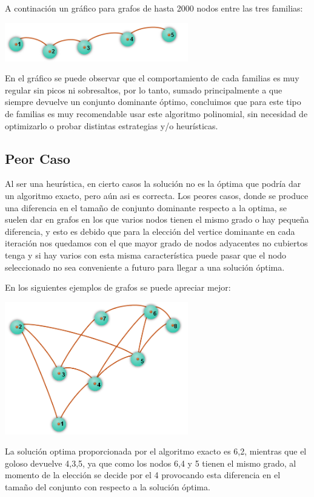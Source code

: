 A continación un gráfico para grafos de hasta 2000 nodos entre las tres familias:

\begin {center}
\includegraphics[width=8cm]{./graficos/grafo_camino.png}
\end {center} 

En el gráfico se puede observar que el comportamiento de cada familias es muy regular sin picos ni sobresaltos, por lo tanto, sumado principalmente a que siempre devuelve un conjunto dominante óptimo, concluimos que para este tipo de familias es muy recomendable usar este algoritmo polinomial, sin necesidad de optimizarlo o probar distintas estrategias y/o heurísticas.

\subsection{Peor Caso}

Al ser una heurística, en cierto casos la solución no es la óptima que podría dar un algoritmo exacto, pero aún asi es correcta.
Los peores casos, donde se produce una diferencia en el tamaño de conjunto dominante respecto a la optima, se suelen dar en grafos en los que varios nodos tienen el mismo grado o hay pequeña diferencia, y esto es debido que para la elección del vertice dominante en cada iteración nos quedamos con el que mayor grado de nodos adyacentes no cubiertos tenga y si hay varios con esta misma característica puede pasar que el nodo seleccionado no sea conveniente a futuro para llegar a una solución óptima.

En los siguientes ejemplos de grafos se puede apreciar mejor:

\begin {center}
\includegraphics[width=8cm]{./graficos/grafo.png}
\end {center} 
La solución optima proporcionada por el algoritmo exacto es {6,2}, mientras que el goloso devuelve {4,3,5}, ya que como los nodos 6,4 y 5 tienen el mismo grado, al momento de la elección se decide por el 4 provocando esta diferencia en el tamaño del conjunto con respecto a la solución óptima.

